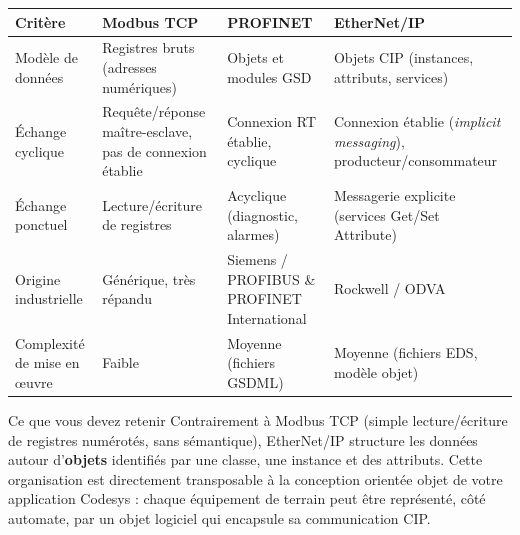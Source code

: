 \begin{center}
    \begin{tabular}{|p{2.8cm}|p{4cm}|p{4cm}|p{4cm}|}
        \hline
        \textbf{Critère} & \textbf{Modbus TCP} & \textbf{PROFINET} & \textbf{EtherNet/IP} \\
        \hline
        Modèle de données & Registres bruts (adresses numériques) & Objets et modules GSD & Objets CIP (instances, attributs, services) \\
        \hline
        Échange cyclique & Requête/réponse maître-esclave, pas de connexion établie & Connexion RT établie, cyclique & Connexion établie (\emph{implicit messaging}), producteur/consommateur \\
        \hline
        Échange ponctuel & Lecture/écriture de registres & Acyclique (diagnostic, alarmes) & Messagerie explicite (services Get/Set Attribute) \\
        \hline
        Origine industrielle & Générique, très répandu & Siemens / PROFIBUS \& PROFINET International & Rockwell / ODVA \\
        \hline
        Complexité de mise en \oe uvre & Faible & Moyenne (fichiers GSDML) & Moyenne (fichiers EDS, modèle objet) \\
        \hline
    \end{tabular}
\end{center}

\begin{UPSTIidee}{Ce que vous devez retenir}
    Contrairement à Modbus TCP (simple lecture/écriture de registres numérotés, sans sémantique), EtherNet/IP structure les données autour d'\textbf{objets} identifiés par une classe, une instance et des attributs. Cette organisation est directement transposable à la conception orientée objet de votre application Codesys : chaque équipement de terrain peut être représenté, côté automate, par un objet logiciel qui encapsule sa communication CIP.
\end{UPSTIidee}
